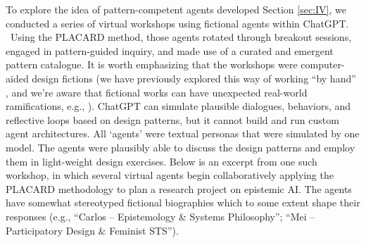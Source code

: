 \documentclass[acmlarge,timestamp]{acmart}
\begin{document}
{To explore the idea of pattern-competent agents developed Section \ref{sec:IV}, we conducted a series of virtual workshops using fictional agents within ChatGPT. ~Using the PLACARD method, those agents rotated through breakout sessions, engaged in pattern-guided inquiry, and made use of a curated and emergent pattern catalogue.  It is worth emphasizing that the workshops were computer-aided design fictions (we have previously explored this way of working “by hand” \cite{fictional-peeragogical}, and we’re aware that fictional works can have unexpected real-world ramifications, e.g., \cite{enwiki:1290575156}).  ChatGPT can simulate plausible dialogues, behaviors, and reflective loops based on design patterns, but it cannot build and run custom agent architectures.  All `agents' were textual personas that were simulated by one model.  The agents were plausibly able to discuss the design patterns and employ them in light-weight design exercises.  Below is an excerpt from one such workshop,
in which several virtual agents begin collaboratively applying the PLACARD methodology to plan a research project on epistemic AI.  The agents have somewhat stereotyped fictional biographies which to some extent shape their responses (e.g., “Carlos – Epistemology \& Systems Philosophy”; “Mei – Participatory Design \& Feminist STS”).
\smallskip

}
\end{document}
